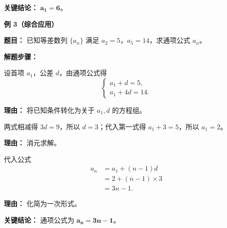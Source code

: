 \begin{examplebox}
	\textbf{\textcolor{CExample}{关键结论：}}
	$\mathbf{a_1 = 6}$。

	\medskip
	\textbf{\textcolor{CExample}{例 3（综合应用）}}

	\textbf{\textcolor{CExample}{题目：}}
	已知等差数列 $\{a_n\}$ 满足 $a_2=5$，$a_5=14$，求通项公式 $a_n$。

	\textbf{\textcolor{CExample}{解题步骤：}}
	\begin{description}[style=nextline, leftmargin=2.8em, labelsep=0.5em, itemsep=0.45em]
		\item[\textbf{第一步（列方程组）：}] 设首项 $a_1$，公差 $d$，由通项公式得
			\[
				\begin{cases}
					a_1 + d = 5,\\
					a_1 + 4d = 14.
			\end{cases}
			\]
			\par\textbf{理由：} 将已知条件转化为关于 $a_1,d$ 的方程组。
		\item[\textbf{第二步（解方程组）：}] 两式相减得 $3d = 9$，所以 $d=3$；代入第一式得 $a_1 + 3 = 5$，所以 $a_1 = 2$。
			\par\textbf{理由：} 消元求解。
		\item[\textbf{第三步（写出通项）：}] 代入公式
			\[
				\begin{aligned}
					a_n &= a_1 + (n-1)d \\
					&= 2 + (n-1)\times 3 \\
					&= 3n - 1.
			\end{aligned}
			\]
			\par\textbf{理由：} 化简为一次形式。
	\end{description}

	\textbf{\textcolor{CExample}{关键结论：}}
	通项公式为 $\mathbf{a_n = 3n - 1}$。
\end{examplebox}
